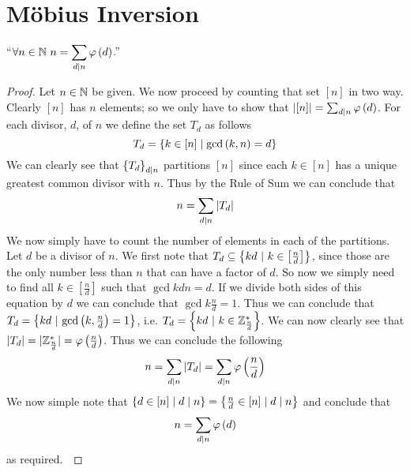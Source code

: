     \section{M\"obius Inversion}
        \begin{definition}
        \end{definition}
        \begin{theorem}
            ``$\forall n \in \mathbb{N} \ n = \displaystyle\sum_{d \mid n} \varphi\left(d\right)$.''
        \end{theorem}
        \begin{proof}
            Let $n \in \mathbb{N}$ be given. We now proceed by counting that set $[n]$ in two way. Clearly
            $[n]$ has $n$ elements; so we only have to show that $|[n]| = \sum_{d \mid n} \varphi\left(d\right)$.
            For each divisor, $d$, of $n$ we define the set $T_d$ as follows
            \[
                T_d = \left\{k \in [n] \mid \mathrm{gcd}\left(k, n\right) = d\right\}
            \]
            We can clearly see that $\left\{T_d\right\}_{d \mid n}$ partitions $[n]$ since each $k \in [n]$
            has a unique greatest common divisor with $n$. Thus by the Rule of Sum we can conclude that
            \[
                n = \sum_{d \mid n} |T_d|
            \]
            We now simply have to count the number of elements in each of the partitions. Let $d$ be a
            divisor of $n$. We first note that $T_d \subseteq \left\{kd \ | \ k \in \left[\frac{n}{d}\right]\right\}$,
            since those are the only number less than $n$ that can have a factor of $d$. So now we simply
            need to find all $k \in \left[\frac{n}{d}\right]$ such that $\gcd{kd}{n} = d$. If we divide both
            sides of this equation by $d$ we can conclude that $\gcd{k}{\frac{n}{d}} = 1$. Thus we can conclude
            that $T_d = \Set{kd \ | \ \gcd{k}{\frac{n}{d}} = 1}$, i.e.
            $T_d = \left\{kd \ | \ k \in \mathbb{Z}_{\frac{n}{d}}^{*}\right\}$. We can now clearly see that
            $|T_d| = |\mathbb{Z}_{\frac{n}{d}}^{*}| = \varphi\left(\frac{n}{d}\right)$. Thus we can conclude the following
            \[
                n = \sum_{d \mid n} |T_d| = \sum_{d \mid n} \varphi\left(\frac{n}{d}\right)
            \]
            We now simple note that
            $\left\{d \in [n] \mid d \mid n\right\} = \left\{\frac{n}{d} \in [n] \mid d \mid n\right\}$ and
            conclude that
            \[
                n = \sum_{d \mid n} \varphi\left(d\right)
            \]
            as required.~\QED
        \end{proof}
        \begin{definition}
        \end{definition}
